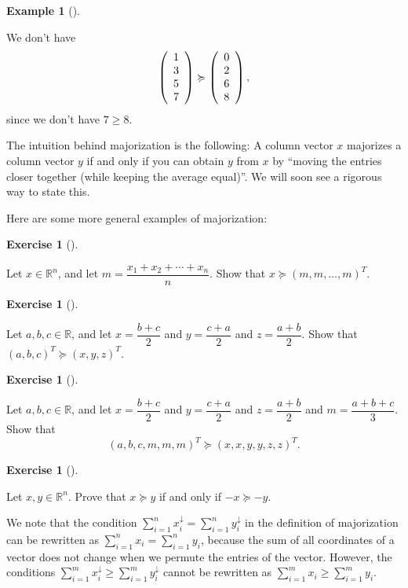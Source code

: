 \documentclass[numbers=enddot,12pt,final,onecolumn,notitlepage]{scrartcl}%
\newcounter{exer}
\numberwithin{exer}{subsection}
\theoremstyle{definition}
\newtheorem{exam}[theo]{Example}
\newenvironment{example}[1][]
{\begin{exam}[#1]\begin{leftbar}}
{\end{leftbar}\end{exam}}
\newtheorem{exmp}[exer]{Exercise}
\newenvironment{exercise}[1][]
{\begin{exmp}[#1]\begin{leftbar}}
{\end{leftbar}\end{exmp}}
\let\sumnonlimits\sum
\renewcommand{\sum}{\sumnonlimits\limits}
\begin{document}
\begin{example}
We don't have%
\[
\left(
\begin{array}
[c]{c}%
1\\
3\\
5\\
7
\end{array}
\right)  \succcurlyeq\left(
\begin{array}
[c]{c}%
0\\
2\\
6\\
8
\end{array}
\right)  ,
\]
since we don't have $7\geq8$.
\end{example}

The intuition behind majorization is the following: A column vector $x$
majorizes a column vector $y$ if and only if you can obtain $y$ from $x$ by
\textquotedblleft moving the entries closer together (while keeping the
average equal)\textquotedblright. We will soon see a rigorous way to state this.

Here are some more general examples of majorization:

\begin{exercise}
\label{exe.major.average} Let $x\in\mathbb{R}^{n}$, and let
$m=\dfrac{x_{1}+x_{2}+\cdots+x_{n}}{n}$. Show that $x\succcurlyeq\left(
m,m,\ldots,m\right)  ^{T}$.
\end{exercise}

\begin{exercise}
 Let $a,b,c\in\mathbb{R}$, and let $x=\dfrac{b+c}{2}$ and
$y=\dfrac{c+a}{2}$ and $z=\dfrac{a+b}{2}$. Show that $\left(  a,b,c\right)
^{T}\succcurlyeq\left(  x,y,z\right)  ^{T}$.
\end{exercise}

\begin{exercise}
 Let $a,b,c\in\mathbb{R}$, and let $x=\dfrac{b+c}{2}$ and
$y=\dfrac{c+a}{2}$ and $z=\dfrac{a+b}{2}$ and $m=\dfrac{a+b+c}{3}$. Show that%
\[
\left(  a,b,c,m,m,m\right)  ^{T}\succcurlyeq\left(  x,x,y,y,z,z\right)  ^{T}.
\]

\end{exercise}

\begin{exercise}
 Let $x,y\in\mathbb{R}^{n}$. Prove that $x\succcurlyeq y$ if and only
if $-x\succcurlyeq-y$.
\end{exercise}

We note that the condition $\sum_{i=1}^{n}x_{i}^{\downarrow}=\sum_{i=1}%
^{n}y_{i}^{\downarrow}$ in the definition of majorization can be rewritten as
$\sum_{i=1}^{n}x_{i}=\sum_{i=1}^{n}y_{i}$, because the sum of all coordinates
of a vector does not change when we permute the entries of the vector.
However, the conditions $\sum_{i=1}^{m}x_{i}^{\downarrow}\geq\sum_{i=1}%
^{m}y_{i}^{\downarrow}$ cannot be rewritten as $\sum_{i=1}^{m}x_{i}\geq
\sum_{i=1}^{m}y_{i}$.
\end{document}
